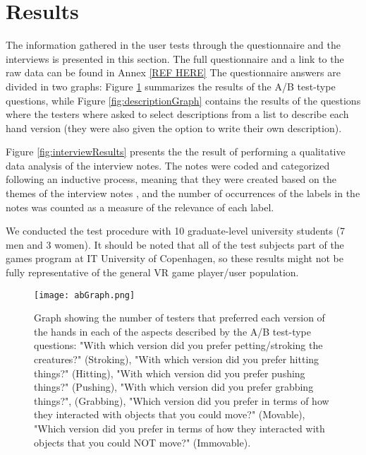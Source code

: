 \section{Results}
\label{sec:results}

The information gathered in the user tests through the questionnaire and the interviews is presented in this section. The full questionnaire and a link to the raw data can be found in Annex \ref{REF HERE} The questionnaire answers are divided in two graphs: Figure \ref{fig:abGraph} summarizes the results of the A/B test-type questions, while Figure \ref{fig:descriptionGraph} contains the results of the questions where the testers where asked to select descriptions from a list to describe each hand version (they were also given the option to write their own description).


Figure \ref{fig:interviewResults} presents the the result of performing a qualitative data analysis of the interview notes. The notes were coded and categorized following an inductive process, meaning that they were created based on the themes of the interview notes \parencite{Burnard2008}, and the number of occurrences of the labels in the notes was counted as a measure of the relevance of each label.

We conducted the test procedure with 10 graduate-level university students (7 men and 3 women). It should be noted that all of the test subjects part of the games program at IT University of Copenhagen, so these results might not be fully representative of the general VR game player/user population.

\begin{figure}[h]
\centering
\texttt{[image: abGraph.png]}
\caption{Graph showing the number of testers that preferred each version of the hands in each of the aspects described by the A/B test-type questions: "With which version did you prefer petting/stroking the creatures?" (Stroking), "With which version did you prefer hitting things?" (Hitting), "With which version did you prefer pushing things?" (Pushing), "With which version did you prefer grabbing things?", (Grabbing), "Which version did you prefer in terms of how they interacted with objects that you could move?" (Movable), "Which version did you prefer in terms of how they interacted with objects that you could NOT move?" (Immovable).}
\label{fig:abGraph}
\end{figure}

